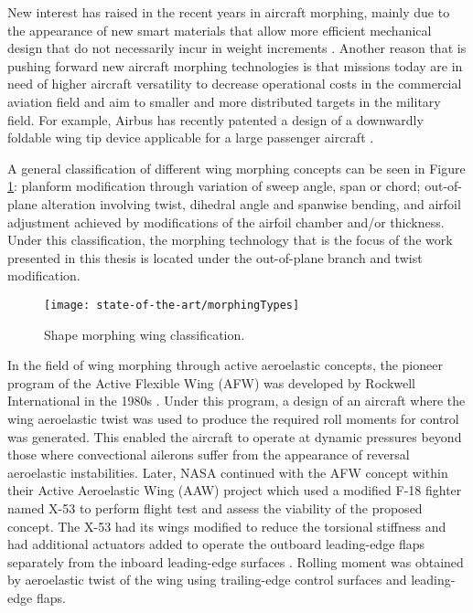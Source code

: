   New interest has raised in the recent years in aircraft morphing, mainly due to the appearance of new smart materials that allow more efficient mechanical design that do not necessarily incur in weight increments \cite{Lloyd2007}. Another reason that is pushing forward new aircraft morphing technologies is that missions today are in need of higher aircraft versatility to decrease operational costs in the commercial aviation field and aim to smaller and more distributed targets in the military field. For example, Airbus has recently patented a design of a downwardly foldable wing tip device applicable for a large passenger aircraft \cite{Boye2015}.

  A general classification of different wing morphing concepts can be seen in Figure \ref{fig:morphingTypes}: planform modification through variation of sweep angle, span or chord; out-of-plane alteration involving twist, dihedral angle and spanwise bending, and airfoil adjustment achieved by modifications of the airfoil chamber and/or thickness. Under this classification, the morphing technology that is the focus of the work presented in this thesis is located under the out-of-plane branch and twist modification.

  \begin{figure}[!htpb]
    \centering
    \texttt{[image: state-of-the-art/morphingTypes]}
    \caption[Shape morphing wing classification]{Shape morphing wing classification. \cite{Barbarino2011}}\label{fig:morphingTypes}
  \end{figure}

  In the field of wing morphing through active aeroelastic concepts, the pioneer program of the Active Flexible Wing (AFW) was developed by Rockwell International in the 1980s \cite{Rockwell}. Under this program, a design of an aircraft where the wing aeroelastic twist was used to produce the required roll moments for control was generated. This enabled the aircraft to operate at dynamic pressures beyond those where convectional ailerons suffer from the appearance of reversal aeroelastic instabilities. Later, NASA continued with the AFW concept within their Active Aeroelastic Wing (AAW) project which used a modified F-18 fighter named X-53 to perform flight test and assess the viability of the proposed concept. The X-53 had its wings modified to reduce the torsional stiffness and had additional actuators added to operate the outboard leading-edge flaps separately from the inboard leading-edge surfaces \cite{NASA}. Rolling moment was obtained by aeroelastic twist of the wing using trailing-edge control surfaces and leading-edge flaps.

